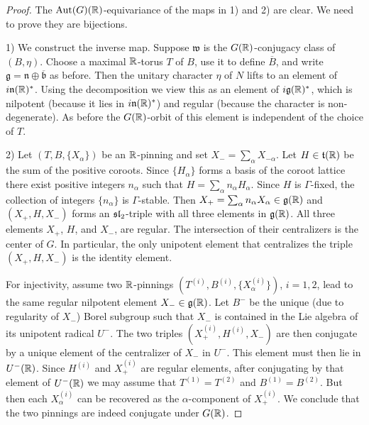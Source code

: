\documentclass{article}
\theoremstyle{definition}
\numberwithin{equation}{section}
\renewcommand{\-}{\hyp{}}
\newcommand{\n}{\mathfrak n}
\newcommand{\g}{\mathfrak g}
\newcommand{\w}{\mathfrak w}
\begin{document}
\begin{proof}

The $\textrm{Aut}(G)(\mathbb{R})$-equivariance of the maps in 1) and  2) are clear. We need to prove they are bijections.

1) We construct the inverse map.  Suppose $\w$ is the $G(\mathbb{R})$-conjugacy class of
$(B,\eta)$. Choose a maximal $\mathbb{R}$-torus $T$ of $B$, use it to define
$\overline B$, and write $\g=\n\oplus \overline{\mathfrak b}$ as 
before. Then the unitary character $\eta$ of $N$ lifts to an element
of $i\n(\R)^*$. Using the decomposition we view this as an element of
$i\g(\R)^*$, which is nilpotent (because it lies in $i\n(\R)^*$) and regular (because the character is non-degenerate). As before the $G(\mathbb{R})$-orbit of
this element is independent of the choice of $T$.

2) Let $(T,B,\{X_\alpha\})$ be an $\mathbb{R}$-pinning and set
$X_-=\sum_\alpha X_{-\alpha}$. Let $H \in \mathfrak{t}(\mathbb{R})$ be the sum of
the positive coroots. Since $\{H_\alpha\}$ forms a basis of the coroot
lattice there exist positive integers $n_\alpha$ such that
$H=\sum_\alpha n_\alpha H_\alpha$. Since $H$ is $\Gamma$-fixed, the
collection of integers $\{n_\alpha\}$ is $\Gamma$-stable. Then
$X_+=\sum_\alpha n_\alpha X_\alpha \in \mathfrak{g}(\mathbb{R})$ and $(X_+,H,X_-)$
forms an $\mathfrak{sl}_2$-triple with all three elements in
$\mathfrak{g}(\mathbb{R})$. All three elements $X_+$, $H$, and $X_-$, are
regular. The intersection of their centralizers is the center of
$G$. In particular, the only unipotent element that centralizes the
triple $(X_+,H,X_-)$ is the identity element.


For injectivity, assume two $\mathbb{R}$-pinnings
$(T^{(i)},B^{(i)},\{X_\alpha^{(i)}\})$, $i=1,2$, lead to the same
regular nilpotent element $X_- \in \mathfrak{g}(\mathbb{R})$. Let $B^-$ be the
unique (due to regularity of $X_-$) Borel subgroup such that $X_-$ is
contained in the Lie algebra of its unipotent radical $U^-$. The two
triples $(X_+^{(i)},H^{(i)},X_-)$ are then conjugate by a unique
element of the centralizer of $X_-$ in $U^-$. This element must then
lie in $U^-(\mathbb{R})$. Since $H^{(i)}$ and $X_+^{(i)}$ are regular
elements, after conjugating by that element of $U^-(\mathbb{R})$ we may assume
that $T^{(1)}=T^{(2)}$ and $B^{(1)}=B^{(2)}$. But then each
$X_\alpha^{(i)}$ can be recovered as the $\alpha$-component of
$X_+^{(i)}$. We conclude that the two pinnings are indeed conjugate
under $G(\mathbb{R})$.


\end{proof}
\end{document}
